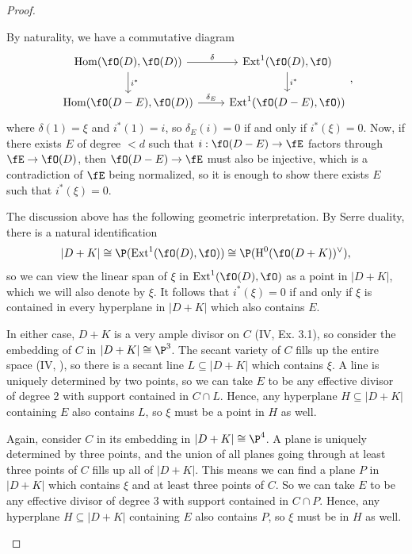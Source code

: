 \documentclass[a4paper]{article}
\begin{document}
\begin{enumerate} [label=\textbf{\arabic*.}, leftmargin=0em]
\begin{proof}
\begin{itemize} [leftmargin=0cm]
                        By naturality, we have a commutative diagram
                        \[ \begin{tikzcd}
                                {\Hom(\fO(D), \fO(D))} \arrow[d, "i^*"] \arrow[r, "\delta"] & \Ext^1(\fO(D),  \fO) \arrow[d, "i^*"] \\
                                {\Hom(\fO(D - E), \fO(D))} \arrow[r, "\delta_E"]       & {\Ext^1(\fO(D - E), \fO))}
                            \end{tikzcd}, \]
                        where $\delta(1) = \xi$ and $i^*(1) = i$, so $\delta_E(i) = 0$ if and only if $i^*(\xi) = 0$.
                        Now, if there exists $E$ of degree $< d$ such that $i : \fO(D - E) \to \fE$ factors through $\fE \to \fO(D)$, then $\fO(D - E) \to \fE$ must also be injective, which is a contradiction of $\fE$ being normalized, so it is enough to show there exists $E$ such that $i^*(\xi) = 0$.

                        The discussion above has the following geometric interpretation.
                        By Serre duality, there is a natural identification
                        \begin{equation*}
                            |D + K| \cong \P(\Ext^1(\fO(D), \fO)) \cong \P(\cH^0(\fO(D + K))^\vee),
                        \end{equation*}
                        so we can view the linear span of $\xi$ in $\Ext^1(\fO(D), \fO)$ as a point in $|D + K|$, which we will also denote by $\xi$.
                        It follows that $i^*(\xi) = 0$ if and only if $\xi$ is contained in every hyperplane in $|D + K|$ which also contains $E$.

                         In either case, $D + K$ is a very ample divisor on $C$ (IV, Ex. 3.1), so consider the embedding of $C$ in $|D + K| \cong \P^3$.
                        The secant variety of $C$ fills up the entire space (IV, ), so there is a secant line $L \subseteq |D + K|$ which contains $\xi$.
                        A line is uniquely determined by two points, so we can take $E$ to be any effective divisor of degree 2 with support contained in $C \cap L$.
                        Hence, any hyperplane $H \subseteq |D + K|$ containing $E$ also contains $L$, so $\xi$ must be a point in $H$ as well.

                         Again, consider $C$ in its embedding in $|D + K| \cong \P^4$.
                        A plane is uniquely determined by three points, and the union of all planes going through at least three points of $C$ fills up all of $|D + K|$.
                        This means we can find a plane $P$ in $|D + K|$ which contains $\xi$ and at least three points of $C$.
                        So we can take $E$ to be any effective divisor of degree 3 with support contained in $C \cap P$.
                        Hence, any hyperplane $H \subseteq |D + K|$ containing $E$ also contains $P$, so $\xi$ must be in $H$ as well.
              \end{itemize}
          \end{proof}


\end{enumerate}
\end{document}
